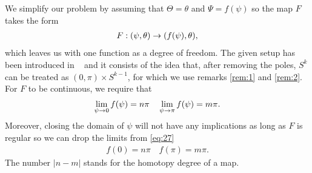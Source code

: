 We simplify our problem by assuming that $\Theta=\theta$ and
$\Psi=f(\psi)$ so the map $F$ takes the form
\begin{align}
  \label{eq:24}
  F:(\psi,\theta)\rightarrow(f(\psi),\theta),
\end{align}
which leaves us with one function as a degree of freedom. The given
setup has been introduced in ~\cite{Eells1964} and it consists of the
idea that, after removing the poles, $S^k$ can be treated as
$(0,\pi)\times S^{k-1}$, for which we use remarks \ref{rem:1} and
\ref{rem:2}.\\

For $F$ to be continuous, we require that
\begin{align}
  \label{eq:27}
  \lim_{\psi\rightarrow0}f(\psi)=n\pi\quad\lim_{\psi\rightarrow\pi}f(\psi)=m\pi.
\end{align}
Moreover, closing the domain of $\psi$ will not have any implications
as long as $F$ is regular so we can drop the limits from \eqref{eq:27}
\begin{align}
  \label{eq:1}
  f(0)=n\pi\quad f(\pi)=m\pi.
\end{align}
The number $\lvert n-m\rvert$ stands for the homotopy degree of a
map.\\

